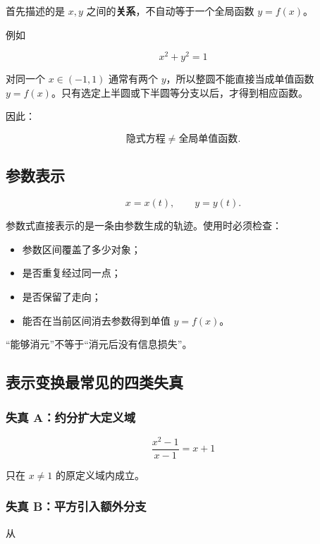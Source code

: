 \documentclass[11pt,a4paper]{ctexart}
\providecommand{\tightlist}{}
\begin{document}
首先描述的是 \(x,y\) 之间的\textbf{关系}，不自动等于一个全局函数
\(y=f(x)\)。

例如

\[
x^2+y^2=1
\]

对同一个 \(x\in(-1,1)\) 通常有两个 \(y\)，所以整圆不能直接当成单值函数
\(y=f(x)\)。只有选定上半圆或下半圆等分支以后，才得到相应函数。

因此：

\[
\boxed{\text{隐式方程}\neq\text{全局单值函数}.}
\]

\subsection{参数表示}\label{ux53c2ux6570ux8868ux793a}

\[
x=x(t),\qquad y=y(t).
\]

参数式直接表示的是一条由参数生成的轨迹。使用时必须检查：

\begin{itemize}
\tightlist
\item
  参数区间覆盖了多少对象；
\item
  是否重复经过同一点；
\item
  是否保留了走向；
\item
  能否在当前区间消去参数得到单值 \(y=f(x)\)。
\end{itemize}

``能够消元''不等于``消元后没有信息损失''。

\subsection{表示变换最常见的四类失真}\label{ux8868ux793aux53d8ux6362ux6700ux5e38ux89c1ux7684ux56dbux7c7bux5931ux771f}

\subsubsection{失真
A：约分扩大定义域}\label{ux5931ux771f-aux7ea6ux5206ux6269ux5927ux5b9aux4e49ux57df}

\[
\frac{x^2-1}{x-1}=x+1
\]

只在 \(x\ne1\) 的原定义域内成立。

\subsubsection{失真
B：平方引入额外分支}\label{ux5931ux771f-bux5e73ux65b9ux5f15ux5165ux989dux5916ux5206ux652f}

从
\end{document}
